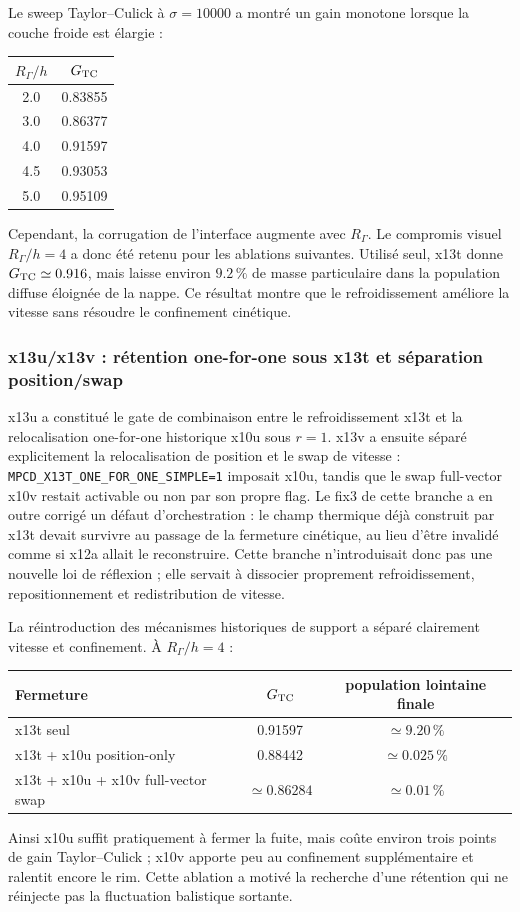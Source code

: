 \documentclass[11pt,a4paper]{article}
\begin{document}
Le sweep Taylor--Culick à $\sigma=10000$ a montré un gain monotone lorsque la couche froide est élargie :
\begin{center}
\begin{tabular}{cc}
\toprule
$R_\Gamma/h$ & $G_{\rm TC}$ \\
\midrule
2.0 & 0.83855 \\
3.0 & 0.86377 \\
4.0 & 0.91597 \\
4.5 & 0.93053 \\
5.0 & 0.95109 \\
\bottomrule
\end{tabular}
\end{center}
Cependant, la corrugation de l'interface augmente avec $R_\Gamma$. Le compromis visuel $R_\Gamma/h=4$ a donc été retenu pour les ablations suivantes. Utilisé seul, x13t donne $G_{\rm TC}\simeq0.916$, mais laisse environ $9.2\,\%$ de masse particulaire dans la population diffuse éloignée de la nappe. Ce résultat montre que le refroidissement améliore la vitesse sans résoudre le confinement cinétique.

\subsubsection{x13u/x13v : rétention one-for-one sous x13t et séparation position/swap}

x13u a constitué le gate de combinaison entre le refroidissement x13t et la relocalisation one-for-one historique x10u sous $r=1$. x13v a ensuite séparé explicitement la relocalisation de position et le swap de vitesse : 
\texttt{MPCD\_X13T\_ONE\_FOR\_ONE\_SIMPLE=1} imposait x10u, tandis que le swap full-vector x10v restait activable ou non par son propre flag. Le fix3 de cette branche a en outre corrigé un défaut d'orchestration : le champ thermique déjà construit par x13t devait survivre au passage de la fermeture cinétique, au lieu d'être invalidé comme si x12a allait le reconstruire. Cette branche n'introduisait donc pas une nouvelle loi de réflexion ; elle servait à dissocier proprement refroidissement, repositionnement et redistribution de vitesse.

La réintroduction des mécanismes historiques de support a séparé clairement vitesse et confinement. À $R_\Gamma/h=4$ :
\begin{center}
\begin{tabular}{lcc}
\toprule
Fermeture & $G_{\rm TC}$ & population lointaine finale \\
\midrule
x13t seul & 0.91597 & $\simeq9.20\,\%$ \\
x13t + x10u position-only & 0.88442 & $\simeq0.025\,\%$ \\
x13t + x10u + x10v full-vector swap & $\simeq0.86284$ & $\simeq0.01\,\%$ \\
\bottomrule
\end{tabular}
\end{center}
Ainsi x10u suffit pratiquement à fermer la fuite, mais coûte environ trois points de gain Taylor--Culick ; x10v apporte peu au confinement supplémentaire et ralentit encore le rim. Cette ablation a motivé la recherche d'une rétention qui ne réinjecte pas la fluctuation balistique sortante.
\end{document}
